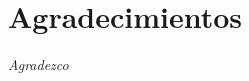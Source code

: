 %
%
\chapter*{Agradecimientos}
\begin{SingleSpace}

\textit{Agradezco }





\end{SingleSpace}
\clearpage